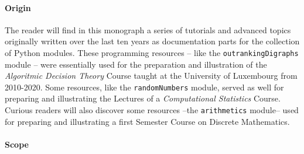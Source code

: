 %
%

\preface





\paragraph{Origin}

The reader will find in this monograph a series of tutorials and advanced topics originally written over the last ten years as documentation parts for the \Digraph collection of Python modules. These programming resources -- like the \texttt{outrankingDigraphs} module -- were essentially used for the preparation and illustration of the \emph{Algoritmic Decision Theory} Course taught at the University of Luxembourg from 2010-2020. Some resources, like the \texttt{randomNumbers} module, served as well for preparing and illustrating the Lectures of a \emph{Computational Statistics} Course. Curious readers will also discover some resources --the \texttt{arithmetics} module-- used for preparing and illustrating a first Semester Course on Discrete Mathematics.

\paragraph{Scope}

